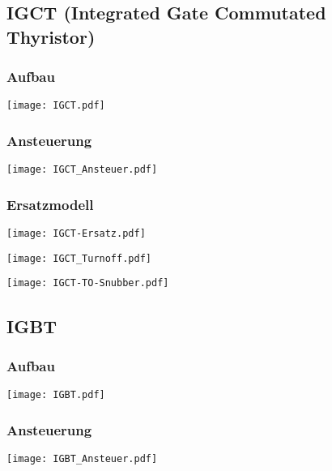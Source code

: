 \documentclass[fs, german]{latex4ei_fs}
\begin{document}
\begin{sectionbox}
\subsection{IGCT (Integrated Gate Commutated Thyristor)}
\subsubsection*{Aufbau}
\texttt{[image: IGCT.pdf]}

\subsubsection*{Ansteuerung}
\texttt{[image: IGCT\_Ansteuer.pdf]}

\subsubsection*{Ersatzmodell}
\texttt{[image: IGCT-Ersatz.pdf]}

\texttt{[image: IGCT\_Turnoff.pdf]}

\texttt{[image: IGCT-TO-Snubber.pdf]}



\end{sectionbox}

\begin{sectionbox}
\subsection{IGBT}
\subsubsection*{Aufbau}
\texttt{[image: IGBT.pdf]}

\subsubsection*{Ansteuerung}
\texttt{[image: IGBT\_Ansteuer.pdf]}

\end{sectionbox}
\end{document}
